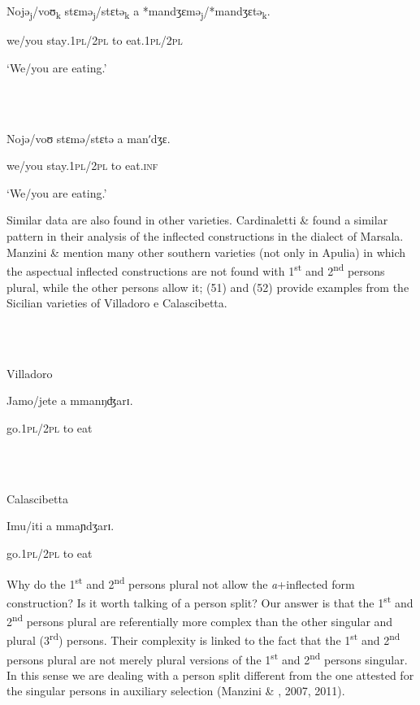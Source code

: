 \documentclass[output=paper]{langsci/langscibook}
\begin{document}
\ea%
    \label{ex:key:50}
    \gll\\
        \\
    \glt
    \z

          Nojə\textsubscript{j}/voʊ\textsubscript{k}   stɛmə\textsubscript{j}/stɛtə\textsubscript{k}   a       *mandʒɛmə\textsubscript{j}/*mandʒɛtə\textsubscript{k}.

we/you  stay\textsc{.1pl/2pl}  to   eat.\textsc{1pl/2pl}

‘We/you are eating.’

\ea%
    \label{ex:key:51}
    \gll\\
        \\
    \glt
    \z

          Nojə/voʊ   stɛmə/stɛtə  a   manʹdʒɛ.

we/you  stay.\textsc{1pl/2pl}  to   eat\textsc{.inf}

‘We/you are eating.’

Similar data are also found in other varieties. Cardinaletti \& \citet{Giusti2003} found a similar pattern in their analysis of the inflected constructions in the dialect of Marsala. Manzini \& \citet{Savoia2005} mention many other southern varieties (not only in Apulia) in which the aspectual inflected constructions are not found with 1\textsuperscript{st} and 2\textsuperscript{nd} persons plural, while the other persons allow it; (51) and (52) provide examples from the Sicilian varieties of Villadoro e Calascibetta.

\ea%
    \label{ex:key:52}
    \gll\\
        \\
    \glt
    \z

          Villadoro

Jamo/jete   a   mmanŋʤarɪ.

  go.\textsc{1pl/2pl}   to  eat 

\ea%
    \label{ex:key:53}
    \gll\\
        \\
    \glt
    \z

          Calascibetta

Imu/iti   a  mmaɲdʒarɪ.  

go.\textsc{1pl/2pl} to  eat 

Why do the 1\textsuperscript{st} and 2\textsuperscript{nd} persons plural not allow the \textit{a}+inflected form construction? Is it worth talking of a person split? Our answer is that the 1\textsuperscript{st} and 2\textsuperscript{nd} persons plural are referentially more complex than the other singular and plural (3\textsuperscript{rd}) persons. Their complexity is linked to the fact that the 1\textsuperscript{st} and 2\textsuperscript{nd} persons plural are not merely plural versions of the 1\textsuperscript{st} and 2\textsuperscript{nd} persons singular. In this sense we are dealing with a person split different from the one attested for the singular persons in auxiliary selection (Manzini \& \citealt{Savoia2005}, 2007, 2011).
\end{document}
